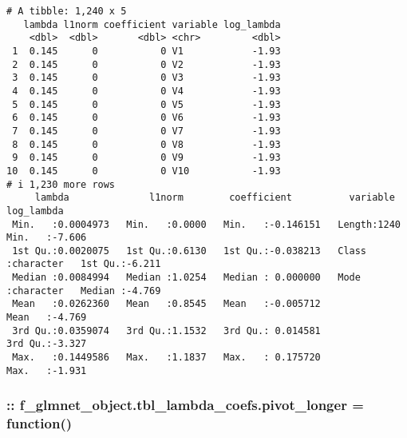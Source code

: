 \documentclass[
]{article}
\begin{document}
\begin{verbatim}
# A tibble: 1,240 x 5
   lambda l1norm coefficient variable log_lambda
    <dbl>  <dbl>       <dbl> <chr>         <dbl>
 1  0.145      0           0 V1            -1.93
 2  0.145      0           0 V2            -1.93
 3  0.145      0           0 V3            -1.93
 4  0.145      0           0 V4            -1.93
 5  0.145      0           0 V5            -1.93
 6  0.145      0           0 V6            -1.93
 7  0.145      0           0 V7            -1.93
 8  0.145      0           0 V8            -1.93
 9  0.145      0           0 V9            -1.93
10  0.145      0           0 V10           -1.93
# i 1,230 more rows
     lambda              l1norm        coefficient          variable           log_lambda    
 Min.   :0.0004973   Min.   :0.0000   Min.   :-0.146151   Length:1240        Min.   :-7.606  
 1st Qu.:0.0020075   1st Qu.:0.6130   1st Qu.:-0.038213   Class :character   1st Qu.:-6.211  
 Median :0.0084994   Median :1.0254   Median : 0.000000   Mode  :character   Median :-4.769  
 Mean   :0.0262360   Mean   :0.8545   Mean   :-0.005712                      Mean   :-4.769  
 3rd Qu.:0.0359074   3rd Qu.:1.1532   3rd Qu.: 0.014581                      3rd Qu.:-3.327  
 Max.   :0.1449586   Max.   :1.1837   Max.   : 0.175720                      Max.   :-1.931  
\end{verbatim}

\hypertarget{f_glmnet_object.tbl_lambda_coefs.pivot_longer-function}{%
\subsubsection{:: f\_glmnet\_object.tbl\_lambda\_coefs.pivot\_longer =
function()}\label{f_glmnet_object.tbl_lambda_coefs.pivot_longer-function}}
\end{document}
